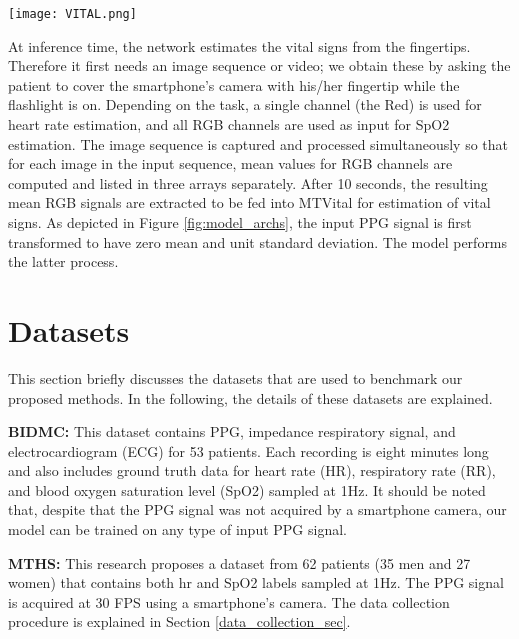 \documentclass[conference]{IEEEtran}
\begin{document}
\begin{figure*}[htbp]
    \centering
    \texttt{[image: VITAL.png]}
    \caption{The proposed architectures for vital sign estimation, there are four different architectures provided. The Base model represents the commonly used architecture for this task, which is used as a baseline. The guide section provides detailed information about the blocks in the proposed architectures.}
    \label{fig:model_archs}
\end{figure*}

At inference time, the network estimates the vital signs from the fingertips. Therefore it first needs an image sequence or video; we obtain these by asking the patient to cover the smartphone's camera with his/her fingertip while the flashlight is on. Depending on the task, a single channel (the Red) is used for heart rate estimation, and all RGB channels are used as input for SpO2 estimation. The image sequence is captured and processed simultaneously so that for each image in the input sequence, mean values for RGB channels are computed and listed in three arrays separately. After 10 seconds, the resulting mean RGB signals are extracted to be fed into MTVital for estimation of vital signs. As depicted in Figure \ref{fig:model_archs}, the input PPG signal is first transformed to have zero mean and unit standard deviation. The model performs the latter process.

\section{Datasets}\label{datasets}
This section briefly discusses the datasets that are used to benchmark our proposed methods. In the following, the details of these datasets are explained.

\textbf{BIDMC\cite{b15}: }This dataset contains PPG, impedance respiratory signal, and electrocardiogram (ECG) for 53 patients. Each recording is eight minutes long and also includes ground truth data for heart rate (HR), respiratory rate (RR), and blood oxygen saturation level (SpO2) sampled at 1Hz. It should be noted that, despite that the PPG signal was not acquired by a smartphone camera, our model can be trained on any type of input PPG signal.

\textbf{MTHS:} This research proposes a dataset from 62 patients (35 men and 27 women) that contains both hr and SpO2 labels sampled at 1Hz. The PPG signal is acquired at 30 FPS using a smartphone's camera. The data collection procedure is explained in Section \ref{data_collection_sec}.
\end{document}

